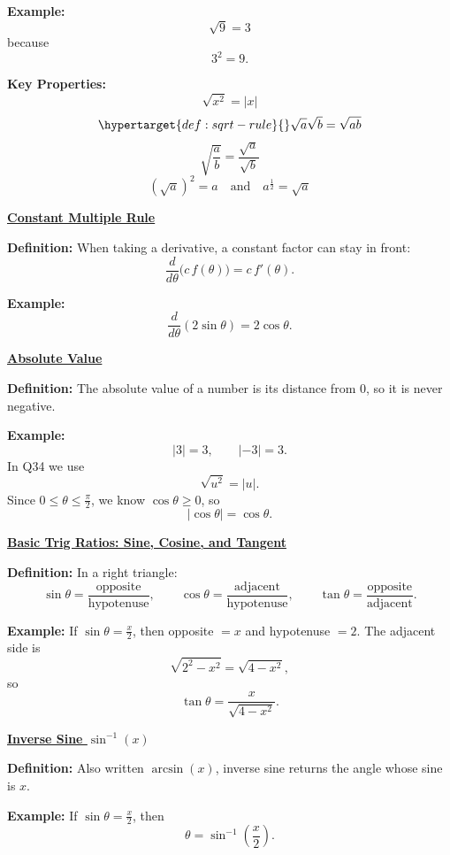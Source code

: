 \documentclass{article}
\newcommand{\defanchor}[1]{\hypertarget{def:#1}{}}
\newcommand{\backtoterm}[2]{\hyperlink{q:#1}{\textbf{#2}}}
\begin{document}
    \textbf{Example:}
    \[
    \sqrt{9}=3
    \]
    because
    \[
    3^2=9.
    \]

    \textbf{Key Properties:}
    \[
    \sqrt{x^2}=|x|
    \]
    \[
    \defanchor{sqrt-rule}\sqrt{a}\sqrt{b}=\sqrt{ab}
    \]
    \[
    \sqrt{\frac{a}{b}}=\frac{\sqrt{a}}{\sqrt{b}}
    \]
    \[
    \left(\sqrt{a}\right)^2=a
    \quad\text{and}\quad
    a^\frac{1}{2}=\sqrt{a}
    \]

    \defanchor{const-mult}\backtoterm{const-mult}{Constant Multiple Rule}

    \textbf{Definition:}
    When taking a derivative, a constant factor can stay in front:
    \[
    \frac{d}{d\theta}\bigl(c\,f(\theta)\bigr)=c\,f'(\theta).
    \]

    \textbf{Example:}
    \[
    \frac{d}{d\theta}(2\sin\theta)=2\cos\theta.
    \]

    \defanchor{abs-val}\backtoterm{abs-val}{Absolute Value}

    \textbf{Definition:}
    The absolute value of a number is its distance from $0$, so it is never negative.

    \textbf{Example:}
    \[
    |3|=3,\qquad |-3|=3.
    \]
    In Q34 we use
    \[
    \sqrt{u^2}=|u|.
    \]
    Since $0\le \theta \le \frac{\pi}{2}$, we know $\cos\theta\ge 0$, so
    \[
    |\cos\theta|=\cos\theta.
    \]

    \defanchor{trig-ratios}\backtoterm{trig-ratios}{Basic Trig Ratios: Sine, Cosine, and Tangent}

    \textbf{Definition:}
    In a right triangle:
    \[
    \sin\theta=\frac{\text{opposite}}{\text{hypotenuse}},\qquad
    \cos\theta=\frac{\text{adjacent}}{\text{hypotenuse}},\qquad
    \tan\theta=\frac{\text{opposite}}{\text{adjacent}}.
    \]

    \textbf{Example:}
    If $\sin\theta=\frac{x}{2}$, then opposite $=x$ and hypotenuse $=2$.
    The adjacent side is
    \[
    \sqrt{2^2-x^2}=\sqrt{4-x^2},
    \]
    so
    \[
    \tan\theta=\frac{x}{\sqrt{4-x^2}}.
    \]

    \defanchor{inv-sine}\backtoterm{inv-sine}{Inverse Sine $\sin^{-1}(x)$}

    \textbf{Definition:}
    Also written $\arcsin(x)$, inverse sine returns the angle whose sine is $x$.

    \textbf{Example:}
    If $\sin\theta=\frac{x}{2}$, then
    \[
    \theta=\sin^{-1}\!\left(\frac{x}{2}\right).
    \]
\end{document}

